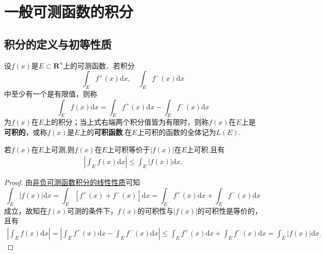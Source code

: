 \documentclass[../../main.tex]{subfiles}
\begin{document}
\section{一般可测函数的积分}

\subsection{积分的定义与初等性质}

\begin{definition}
设\(f(x)\)是\(E \subset \mathbf{R}^n\)上的可测函数．若积分
\[
\int_E f^+(x) \mathrm{d}x, \quad \int_E f^-(x) \mathrm{d}x
\]
中至少有一个是有限值，则称
\[
\int_E f(x) \mathrm{d}x = \int_E f^+(x) \mathrm{d}x - \int_E f^-(x) \mathrm{d}x
\]
为\(f(x)\)在\(E\)上的积分；当上式右端两个积分值皆为有限时，则称\(f(x)\)在\(E\)上是\textbf{可积的}，或称\(f(x)\)是\(E\)上的\textbf{可积函数}.在\(E\)上可积的函数的全体记为\(L(E)\).
\end{definition}

\begin{theorem}\label{theorem:f与|f|的可积性等价}
若\(f(x)\)在$E$上可测,则\(f(x)\)在$E$上可积等价于\(|f(x)|\)在$E$上可积,且有
\begin{align*}
\left| \int_E f(x) \mathrm{d}x \right| \leqslant \int_E |f(x)| \mathrm{d}x. 
\end{align*}
\end{theorem}
\begin{proof}
由\hyperref[theorem:非负可测函数积分的线性性质]{非负可测函数积分的线性性质}可知
\[
\int_E{|f(x)|\mathrm{d}x}=\int_E{\left[ f^+\left( x \right) +f^-\left( x \right) \right] \mathrm{d}x}=\int_E{f^+(x)\mathrm{d}x}+\int_E{f^-(x)\mathrm{d}x}
\]
成立，故知在\(f(x)\)可测的条件下，\(f(x)\)的可积性与\(|f(x)|\)的可积性是等价的，且有
\begin{align*}
\left| \int_E{f(x)\mathrm{d}x} \right|=\left| \int_E{f^+(x)\mathrm{d}x}-\int_E{f^-(x)\mathrm{d}x} \right|\leqslant \int_E{f^+(x)\mathrm{d}x}+\int_E{f^-(x)\mathrm{d}x}=\int_E{|f(x)|\mathrm{d}x}.
\end{align*}

\end{proof}
\end{document}
